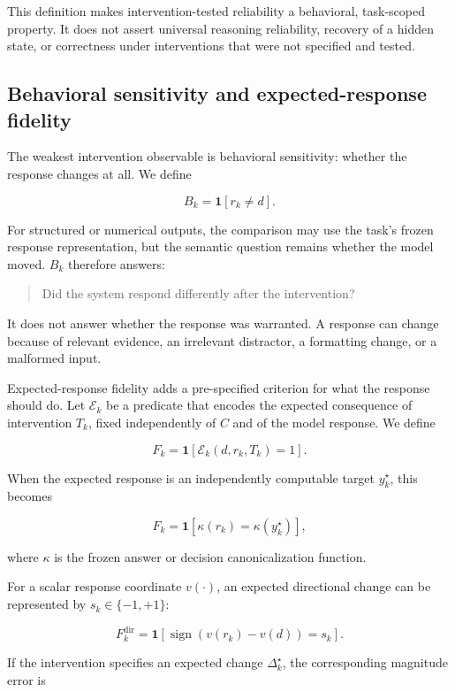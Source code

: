 \documentclass[11pt]{article}
\begin{document}
This definition makes intervention-tested reliability a behavioral, task-scoped property. It does not assert universal reasoning reliability, recovery of a hidden state, or correctness under interventions that were not specified and tested.

\subsection{Behavioral sensitivity and expected-response fidelity}

The weakest intervention observable is behavioral sensitivity: whether the response changes at all. We define

\[
B_k=\mathbf{1}[r_k\neq d].
\]

For structured or numerical outputs, the comparison may use the task's frozen response representation, but the semantic question remains whether the model moved. \(B_k\) therefore answers:

\begin{quote}
Did the system respond differently after the intervention?
\end{quote}

It does not answer whether the response was warranted. A response can change because of relevant evidence, an irrelevant distractor, a formatting change, or a malformed input.

Expected-response fidelity adds a pre-specified criterion for what the response should do. Let \(\mathcal{E}_k\) be a predicate that encodes the expected consequence of intervention \(T_k\), fixed independently of \(C\) and of the model response. We define

\[
F_k=\mathbf{1}\!\left[\mathcal{E}_k(d,r_k,T_k)=1\right].
\]

When the expected response is an independently computable target \(y_k^\star\), this becomes

\[
F_k=\mathbf{1}\!\left[\kappa(r_k)=\kappa(y_k^\star)\right],
\]

where \(\kappa\) is the frozen answer or decision canonicalization function.

For a scalar response coordinate \(v(\cdot)\), an expected directional change can be represented by \(s_k\in\{-1,+1\}\):

\[
F_k^{\mathrm{dir}}
=
\mathbf{1}\!\left[
\operatorname{sign}\!\left(v(r_k)-v(d)\right)=s_k
\right].
\]

If the intervention specifies an expected change \(\Delta_k^\star\), the corresponding magnitude error is
\end{document}
